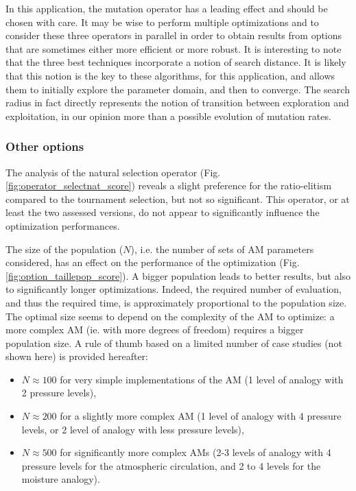 \documentclass{ametsoc}
\begin{document}
In this application, the mutation operator has a leading effect and should be chosen with care. It may be wise to perform multiple optimizations and to consider these three operators in parallel in order to obtain results from options that are sometimes either more efficient or more robust. It is interesting to note that the three best techniques incorporate a notion of search distance. It is likely that this notion is the key to these algorithms, for this application, and allows them to initially explore the parameter domain, and then to converge. The search radius in fact directly represents the notion of transition between exploration and exploitation, in our opinion more than a possible evolution of mutation rates.


\subsubsection{Other options}

The analysis of the natural selection operator (Fig. \ref{fig:operator_selectnat_score}) reveals a slight preference for the ratio-elitism compared to the tournament selection, but not so significant. This operator, or at least the two assessed versions, do not appear to significantly influence the optimization performances.

The size of the population ($N$), i.e. the number of sets of AM parameters considered, has an effect on the performance of the optimization (Fig. \ref{fig:option_taillepop_score}). A bigger population leads to better results, but also to significantly longer optimizations. Indeed, the required number of evaluation, and thus the required time, is approximately proportional to the population size. The optimal size seems to depend on the complexity of the AM to optimize: a more complex AM (ie. with more degrees of freedom) requires a bigger population size. A rule of thumb based on a limited number of case studies (not shown here) is provided hereafter:

\begin{itemize}
	\item $N\approx100$ for very simple implementations of the AM (1 level of analogy with 2 pressure levels),
	\item $N\approx200$ for a slightly more complex AM (1 level of analogy with 4 pressure levels, or 2 level of analogy with less pressure levels),
	\item $N\approx500$ for significantly more complex AMs (2-3 levels of analogy with 4 pressure levels for the atmospheric circulation, and 2 to 4 levels for the moisture analogy).
\end{itemize}
\end{document}
